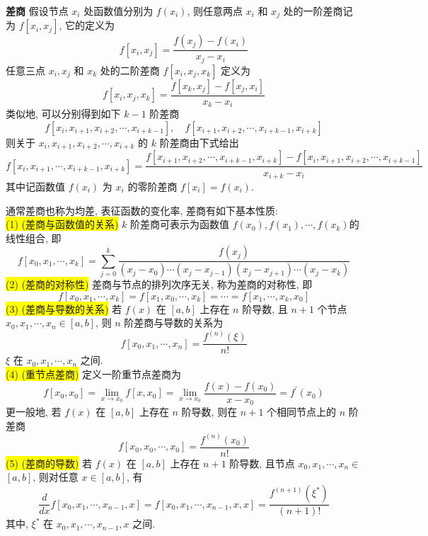\textbf{差商} \; 假设节点 $ x_{i} $ 处函数值分别为 $ f\left(x_{i}\right) $, 则任意两点 $ x_{i} $ 和 $ x_{j} $ 处的一阶差商记为 $ f\left[x_{i}, x_{j}\right] $, 它的定义为
$$
f\left[x_{i}, x_{j}\right]=\frac{f\left(x_{j}\right)-f\left(x_{i}\right)}{x_{j}-x_{i}}
$$
任意三点 $ x_{i}, x_{j} $ 和 $ x_{k} $ 处的二阶差商 $ f\left[x_{i}, x_{j}, x_{k}\right] $ 定义为
$$
f\left[x_{i}, x_{j}, x_{k}\right]=\frac{f\left[x_{k}, x_{j}\right]-f\left[x_{j}, x_{i}\right]}{x_{k}-x_{i}}
$$
类似地, 可以分别得到如下 $ k-1 $ 阶差商
$$
f\left[x_{i}, x_{i+1}, x_{i+2}, \cdots, x_{i+k-1}\right], \quad f\left[x_{i+1}, x_{i+2}, \cdots, x_{i+k-1}, x_{i+k}\right]
$$
则关于 $ x_{i}, x_{i+1}, x_{i+2}, \cdots, x_{i+k} $ 的 $ k $ 阶差商由下式给出
$$
 f\left[x_{i}, x_{i+1}, \cdots, x_{i+k-1}, x_{i+k}\right] =  \frac{f\left[x_{i+1}, x_{i+2}, \cdots, x_{i+k-1}, x_{i+k}\right]-f\left[x_{i}, x_{i+1}, x_{i+2}, \cdots, x_{i+k-1}\right]}{x_{i+k}-x_{i}}
$$
其中记函数值 $ f\left(x_{i}\right) $ 为 $ x_{i} $ 的零阶差商 $ f\left[x_{i}\right]=f\left(x_{i}\right) $.

通常差商也称为均差, 表征函数的变化率, 差商有如下基本性质:\\
\colorbox{yellow}{(1) (差商与函数值的关系)} $ k $ 阶差商可表示为函数值 $ f\left(x_{0}\right), f\left(x_{1}\right), \cdots, f\left(x_{k}\right) $的线性组合, 即
$$\boxed{
f\left[x_{0}, x_{1}, \cdots, x_{k}\right]=\sum_{j=0}^{k} \frac{f\left(x_{j}\right)}{\left(x_{j}-x_{0}\right) \cdots\left(x_{j}-x_{j-1}\right)\left(x_{j}-x_{j+1}\right) \cdots\left(x_{j}-x_{k}\right)}}
$$
\colorbox{yellow}{(2) (差商的对称性)} 差商与节点的排列次序无关, 称为差商的对称性, 即
$$
f\left[x_{0}, x_{1}, \cdots, x_{k}\right]=f\left[x_{1}, x_{0}, \cdots, x_{k}\right]=\cdots=f\left[x_{1}, \cdots, x_{k}, x_{0}\right]
$$
\colorbox{yellow}{(3) (差商与导数的关系)} 若 $ f(x) $ 在 $ [a, b] $ 上存在 $ n $ 阶导数, 且 $ n+1 $ 个节点 $ x_{0}, x_{1}, \cdots, x_{n} \in[a, b] $, 则 $ n $ 阶差商与导数的关系为
$$\boxed{
f\left[x_{0}, x_{1}, \cdots, x_{n}\right]=\frac{f^{(n)}(\xi)}{n!}}
$$
$ \xi $ 在 $ x_{0}, x_{1}, \cdots, x_{n} $ 之间.\\
\colorbox{yellow}{(4) (重节点差商)} 定义一阶重节点差商为
$$
f\left[x_{0}, x_{0}\right]=\lim _{x \rightarrow x_{0}} f\left[x, x_{0}\right]=\lim _{x \rightarrow x_{0}} \frac{f(x)-f\left(x_{0}\right)}{x-x_{0}}=f^{\prime}\left(x_{0}\right)
$$
更一般地, 若 $ f(x) $ 在 $ [a, b] $ 上存在 $ n $ 阶导数, 则在 $ n+1 $ 个相同节点上的 $ n $ 阶差商
$$
f\left[x_{0}, x_{0}, \cdots, x_{0}\right]=\frac{f^{(n)}\left(x_{0}\right)}{n!}
$$
\colorbox{yellow}{(5) (差商的导数)} 若 $ f(x) $ 在 $ [a, b] $ 上存在 $ n+1 $ 阶导数, 且节点 $ x_{0}, x_{1}, \cdots, x_{n} \in $ $ [a, b] $, 则对任意 $ x \in[a, b] $, 有
$$
\frac{d}{d x} f\left[x_{0}, x_{1}, \cdots, x_{n-1}, x\right]=f\left[x_{0}, x_{1}, \cdots, x_{n-1}, x, x\right]=\frac{f^{(n+1)}\left(\xi^{*}\right)}{(n+1)!}
$$
其中, $ \xi^{*} $ 在 $ x_{0}, x_{1}, \cdots, x_{n-1}, x $ 之间.


